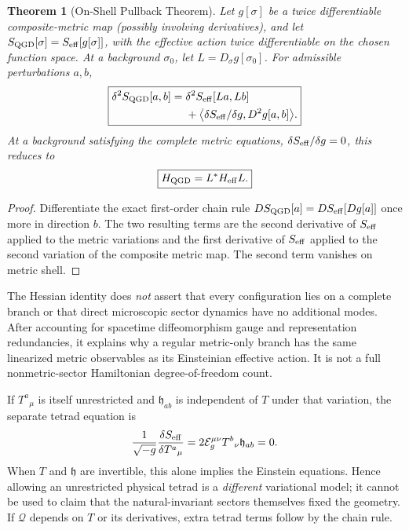 \documentclass[11pt,a4paper]{article}
\newtheorem{theorem}{Theorem}[section]
\begin{document}
\begin{theorem}[On-Shell Pullback Theorem]
\label{thm:qgd062-hessian}
Let $g[\sigma]$ be a twice differentiable composite-metric map
(possibly involving derivatives), and let
$S_{\rm QGD}[\sigma]=S_{\rm eff}[g[\sigma]]$, with the effective
action twice differentiable on the chosen function space.
At a background $\sigma_0$, let $L=D_\sigma g[\sigma_0]$.
For admissible perturbations $a,b$,
\begin{equation}\label{eq:qgd062-hessian-general}
\boxed{\begin{aligned}
\delta^2S_{\rm QGD}[a,b]
={}&\delta^2S_{\rm eff}[La,Lb]\\
&+\big\langle\delta S_{\rm eff}/\delta g,
D^2g[a,b]\big\rangle.
\end{aligned}}
\end{equation}
At a background satisfying the complete metric equations,
$\delta S_{\rm eff}/\delta g=0$, this reduces to
\begin{equation}\label{eq:qgd062-hessian-onshell}
\boxed{H_{\rm QGD}=L^*H_{\rm eff}L.}
\end{equation}
\end{theorem}
\begin{proof}
Differentiate the exact first-order chain rule
$DS_{\rm QGD}[a]=DS_{\rm eff}[Dg[a]]$
once more in direction $b$. The two resulting terms are the
second derivative of $S_{\rm eff}$ applied to the metric variations
and the first derivative of $S_{\rm eff}$ applied to the second
variation of the composite metric map. The second term vanishes on metric shell.
\end{proof}
\noindent The Hessian identity does \emph{not} assert that every
configuration lies on a complete branch or that direct microscopic
sector dynamics have no additional modes. After accounting for spacetime
diffeomorphism gauge and representation redundancies, it explains why a
regular metric-only branch has the same linearized metric observables as
its Einsteinian effective action. It is not a full nonmetric-sector
Hamiltonian degree-of-freedom count.


If $T^a{}_\mu$ is itself unrestricted and $\mathfrak h_{ab}$ is independent
of $T$ under that variation, the separate tetrad equation is
\begin{equation}\label{eq:qgd061-tetrad}
\frac1{\sqrt{-g}}\frac{\delta S_{\rm eff}}
{\delta T^a{}_{\mu}}=2\mathcal E_g^{\mu\nu}
T^b{}_{\nu}\mathfrak h_{ab}=0.
\end{equation}
When $T$ and $\mathfrak h$ are invertible, this alone implies the
Einstein equations. Hence allowing an unrestricted physical tetrad is a
\emph{different} variational model; it cannot be used to claim that the
natural-invariant sectors themselves fixed the geometry. If $\mathcal Q$
depends on $T$ or its derivatives, extra tetrad terms follow by the chain rule.
\end{document}
